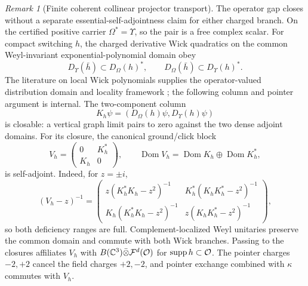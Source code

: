 \documentclass[11pt]{article}
\theoremstyle{definition}
\theoremstyle{remark}
\newtheorem{remark}[theorem]{Remark}
\begin{document}
\begin{remark}[Finite coherent collinear projector transport]
The operator gap closes without a separate essential-self-adjointness claim
for either charged branch.  On the certified positive carrier
$\Omega^*=\Upsilon$, so the pair is a free complex scalar.  For compact
switching $h$, the charged derivative Wick quadratics on the common
Weyl-invariant exponential-polynomial domain obey
\[
 D_\Upsilon(\bar h)\subset D_\Omega(h)^*,\qquad
 D_\Omega(\bar h)\subset D_\Upsilon(h)^* .
\]
The literature on local Wick polynomials supplies the operator-valued
distribution domain and locality framework \cite{BFK1996,Sanders2012}; the
following column and pointer argument is internal.  The two-component column
\[
 K_h\psi=(D_\Omega(h)\psi,D_\Upsilon(h)\psi)
\]
is closable: a vertical graph limit pairs to zero against the two dense
adjoint domains.  For its closure, the canonical ground/click block
\[
 V_h=\begin{pmatrix}0&K_h^*\\K_h&0\end{pmatrix},\qquad
 \operatorname{Dom}V_h=\operatorname{Dom}K_h\oplus
                         \operatorname{Dom}K_h^*,
\]
is self-adjoint.  Indeed, for $z=\pm i$,
\[
 (V_h-z)^{-1}=
 \begin{pmatrix}
 z(K_h^*K_h-z^2)^{-1}&K_h^*(K_hK_h^*-z^2)^{-1}\\
 K_h(K_h^*K_h-z^2)^{-1}&z(K_hK_h^*-z^2)^{-1}
 \end{pmatrix},
\]
so both deficiency ranges are full.  Complement-localized Weyl unitaries
preserve the common domain and commute with both Wick branches.  Passing to
the closures affiliates $V_h$ with
$B(\mathbb C^3)\bar\otimes{\cal F}^{d}({\cal O})$ for
$\operatorname{supp}h\subset{\cal O}$.  The pointer charges $-2,+2$ cancel
the field charges $+2,-2$, and pointer exchange combined with $\kappa$
commutes with $V_h$.


\end{remark}
\end{document}
